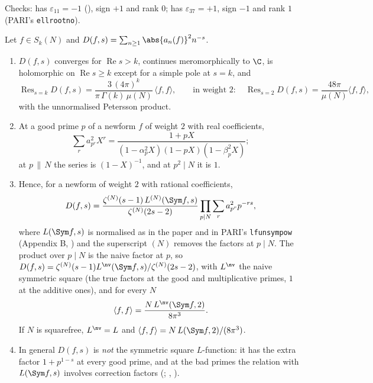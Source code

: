 Checks:  has $\varepsilon_{11}=-1$ (), sign $+1$ and rank $0$;  has $\varepsilon_{37}=+1$, sign $-1$ and rank $1$ (PARI's \texttt{ellrootno}).

\begin{theorem}\label{thm:hecke:rankin-selberg}
Let $f\in S_k(N)$ and $D(f,s)=\sum_{n\ge1}\abs{a_n(f)}^2n^{-s}$.
\begin{enumerate}[label=(\roman*)]
\item $D(f,s)$ converges for $\operatorname{Re}s>k$, continues meromorphically to $\C$, is holomorphic on $\operatorname{Re}s\ge k$ except for a simple pole at $s=k$, and
\[
\operatorname{Res}_{s=k}D(f,s)=\frac{3\,(4\pi)^k}{\pi\,\Gamma(k)\,\mu(N)}\,\langle f,f\rangle,\qquad\text{in weight }2:\quad\operatorname{Res}_{s=2}D(f,s)=\frac{48\pi}{\mu(N)}\langle f,f\rangle,
\]
with the unnormalised Petersson product.
\item At a good prime $p$ of a newform $f$ of weight $2$ with real coefficients,
\[
\sum_ra_{p^r}^2X^r=\frac{1+pX}{(1-\alpha_p^2X)(1-pX)(1-\beta_p^2X)};
\]
at $p\,\|\,N$ the series is $(1-X)^{-1}$, and at $p^2\mid N$ it is $1$.
\item Hence, for a newform of weight $2$ with rational coefficients,
\[
D(f,s)=\frac{\zeta^{(N)}(s-1)\,L^{(N)}(\Sym f,s)}{\zeta^{(N)}(2s-2)}\prod_{p\mid N}\sum_ra_{p^r}^2p^{-rs},
\]
where $L(\Sym f,s)$ is
normalised as in the paper and in PARI's \texttt{lfunsympow} (Appendix B, ) and the superscript $(N)$ removes the factors at $p\mid N$. The product over $p\mid N$ is the
naive factor at $p$, so $D(f,s)=\zeta^{(N)}(s-1)L^{\nv}(\Sym f,s)/\zeta^{(N)}(2s-2)$, with $L^{\nv}$ the naive symmetric square (the true factors at the good and multiplicative primes, $1$ at
the additive ones), and for every $N$
\[
\langle f,f\rangle=\frac{N\,L^{\nv}(\Sym f,2)}{8\pi^3}.
\]
If $N$ is squarefree, $L^{\nv}=L$ and $\langle f,f\rangle=N\,L(\Sym f,2)/(8\pi^3)$.
\item In general $D(f,s)$ is \emph{not} the symmetric square $L$-function: it has the extra factor $1+p^{1-s}$ at every good prime, and at the bad primes the relation with $L(\Sym f,s)$
involves correction factors (; \cite[Lemma 2.12]{DFG04}, \cite{Shimura76}).
\end{enumerate}
\end{theorem}

